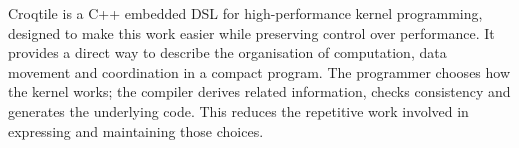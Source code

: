 Croqtile is a C++ embedded DSL for high-performance kernel programming, designed to make this work easier while preserving control over performance. It provides a direct way to describe the organisation of computation, data movement and coordination in a compact program. The programmer chooses how the kernel works; the compiler derives related information, checks consistency and generates the underlying code. This reduces the repetitive work involved in expressing and maintaining those choices.

